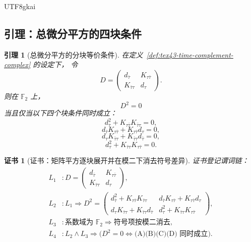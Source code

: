 \documentclass[12pt]{article}
\newtheorem{lemma}{引理}[section]
\newtheorem{Certificate}{证书}[section]
\newcommand{\Ftwo}{\mathbb{F}_2}
\begin{document}
\begin{CJK*}{UTF8}{gkai}
\subsection{引理：总微分平方的四块条件}
\label{subsec:tex43-ch8-lemma}

\begin{lemma}[总微分平方的分块等价条件]
\label{lem:tex43-block-conditions}
在定义~\ref{def:tex43-time-complement-complex} 的设定下，
令
\[
  D=
  \begin{pmatrix}
    d_{\bar\tau} & K_{\tau\bar\tau}\\
    K_{\bar\tau\tau} & d_\tau
  \end{pmatrix}.
\]
则在 $\Ftwo$ 上，
\[
  D^2=0
\]
当且仅当以下四个块条件同时成立：
\[
  d_{\bar\tau}^2 + K_{\tau\bar\tau}K_{\bar\tau\tau}=0,
  \tag{A}
\]
\[
  d_{\bar\tau}K_{\tau\bar\tau}+K_{\tau\bar\tau}d_\tau=0,
  \tag{B}
\]
\[
  d_\tau K_{\bar\tau\tau}+K_{\bar\tau\tau}d_{\bar\tau}=0,
  \tag{C}
\]
\[
  d_\tau^2 + K_{\bar\tau\tau}K_{\tau\bar\tau}=0.
  \tag{D}
\]
\end{lemma}

\begin{Certificate}[证书：矩阵平方逐块展开并在模二下消去符号差异]
\label{cert:tex43-block-conditions}
证书登记谓词链：
\[
\begin{aligned}
  L_1 &: D=
         \begin{pmatrix}
           d_{\bar\tau} & K_{\tau\bar\tau}\\
           K_{\bar\tau\tau} & d_\tau
         \end{pmatrix},\\
  L_2 &: L_1 \Rightarrow
         D^2=
         \begin{pmatrix}
           d_{\bar\tau}^2 + K_{\tau\bar\tau}K_{\bar\tau\tau}
           &
           d_{\bar\tau}K_{\tau\bar\tau}+K_{\tau\bar\tau}d_\tau\\
           d_\tau K_{\bar\tau\tau}+K_{\bar\tau\tau}d_{\bar\tau}
           &
           d_\tau^2 + K_{\bar\tau\tau}K_{\tau\bar\tau}
         \end{pmatrix},\\
  L_3 &: \text{系数域为 }\Ftwo\Rightarrow\text{符号项按模二消去},\\
  L_4 &: L_2\wedge L_3 \Rightarrow
         \big(D^2=0 \iff \text{(A)(B)(C)(D) 同时成立}\big).
\end{aligned}
\]
\end{Certificate}


\end{CJK*}
\end{document}
